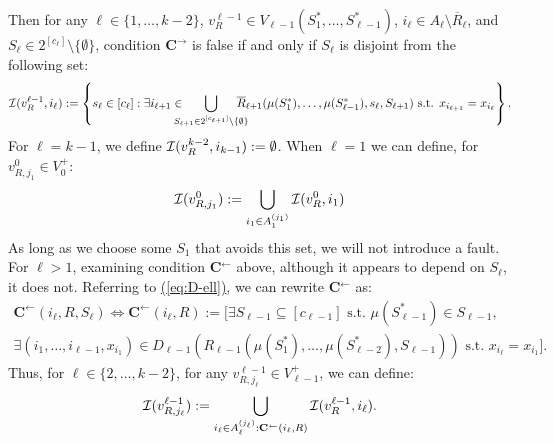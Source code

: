 \documentclass{article}
\newcommand{\eq}[1]{\hyperref[eq:#1]{(\ref*{eq:#1})}}
\renewcommand{\>}{\rangle}
\newcommand{\<}{\langle}
\renewcommand{\(}{\left(}
\renewcommand{\)}{\right)}
\begin{document}
Then for any $\ell\in \{1,\dots,k-2\}$, $v_R^{\ell-1}\in V_{\ell-1}(S_1^*,\dots,S_{\ell-1}^*)$, $i_{\ell}\in A_{\ell}\setminus\overline{R}_{\ell}$, and $S_{\ell}\in 2^{[c_{\ell}]}\setminus\{\emptyset\}$, condition $\mathbf{C}^{\rightarrow}$ is false if and only if $S_{\ell}$ is disjoint from the following set:
\begin{equation}
{\cal I}(v^{\ell-1}_R,i_{\ell}):=\left\{s_{\ell}\in [c_{\ell}]: \exists i_{\ell+1}\in\!\!\!\!\!\! \bigcup_{S_{\ell+1}\in 2^{[c_{\ell+1}]}\setminus\{\emptyset\}}\!\!\!\!\!\!\!\overline{R}_{\ell+1}(\mu(S_1^*),\dots,\mu(S_{\ell-1}^*),s_{\ell},S_{\ell+1})\mbox{ s.t. }x_{i_{\ell+1}}=x_{i_{\ell}}\right\}.\label{eq:k-dist-I-i}
\end{equation}
For $\ell=k-1$, we define ${\cal I}(v^{k-2}_R,i_{k-1}):=\emptyset$. When $\ell=1$ we can define, for $v_{R,j_1}^0\in V_0^+$:
\begin{equation}
	{\cal I}(v^{0}_{R,j_{1}}):=\bigcup_{i_{1}\in A_{1}^{(j_{1})}}{\cal I}(v^{0}_R,i_{1})\label{eq:k-dist-cal-I-1}
\end{equation}
As long as we choose some $S_1$ that avoids this set, we will not introduce a fault. For $\ell>1$,
examining condition \textbf{C}$^{\leftarrow}$ above, although it appears to depend on $S_{\ell}$, it does not. Referring to \eq{D-ell}, we can rewrite \textbf{C}$^{\leftarrow}$ as:
\begin{multline*}
\mathbf{C}^{\leftarrow}(i_{\ell},R,S_{\ell})\Leftrightarrow \mathbf{C}^{\leftarrow}(i_{\ell},R):= \bigg[\exists S_{\ell-1}\subseteq [c_{\ell-1}] \mbox{ s.t. }\mu(S_{\ell-1}^*)\in S_{\ell-1},\\
\exists (i_1,\dots,i_{\ell-1},x_{i_1})\in D_{\ell-1}(R_{\ell-1}(\mu(S_1^*),\dots,\mu(S_{\ell-2}^*),S_{\ell-1}))
\mbox{ s.t. }x_{i_{\ell}}=x_{i_1}\bigg].\label{eq:k-dist-Carrow}
\end{multline*}
Thus, for $\ell\in\{2,\dots,k-2\}$, for any $v^{\ell-1}_{R,j_{\ell}}\in V_{\ell-1}^+$, we can define:
\begin{equation}
{\cal I}(v^{\ell-1}_{R,j_{\ell}}):=\bigcup_{i_{\ell}\in A_{\ell}^{(j_{\ell})}:\mathbf{C}^{\leftarrow}(i_{\ell},R)}{\cal I}(v^{\ell-1}_R,i_{\ell}).\label{eq:k-dist-cal-I}
\end{equation}
\end{document}
